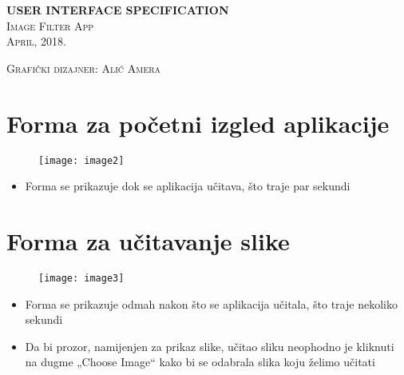 \documentclass[12pt]{scrreprt}
\begin{document}
	\begin{titlepage}
		\begin{center}
			\vspace*{10cm}
			\huge{\bfseries{USER INTERFACE SPECIFICATION}}\\
			[2mm]
			\textsc{\LARGE Image Filter App}\\
			[2mm]
			\textsc{\Large April, 2018.}\\
			[3cm]
		\end{center}
		\begin{flushleft}
			\textsc{Grafički dizajner: Alić Amera}
		\end{flushleft}
	\end{titlepage}

\tableofcontents  %

\chapter{Forma za početni izgled aplikacije}

\begin{figure}[h]
	\begin{Center}
		\texttt{[image: image2]}
	\end{Center}
\end{figure}

\begin{itemize}
	\item Forma se prikazuje dok se aplikacija učitava, što traje par sekundi
\end{itemize}

\chapter{Forma za učitavanje slike}

\begin{figure}[h]
	\begin{Center}
		\texttt{[image: image3]}
	\end{Center}
\end{figure}

\begin{itemize}
	\item Forma se prikazuje odmah nakon što se aplikacija učitala, što traje nekoliko sekundi
	\item Da bi prozor, namijenjen za prikaz slike, učitao sliku neophodno je kliknuti na dugme „Choose Image“ kako bi se odabrala slika koju želimo učitati
\end{itemize}
\end{document}
